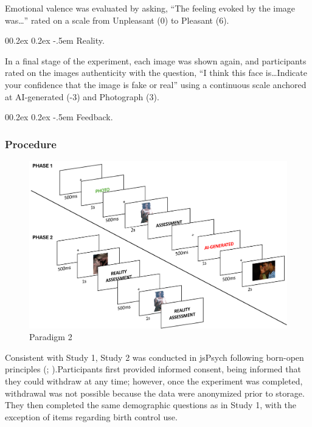 \documentclass[
  jou,
  floatsintext,
  longtable,
  nolmodern,
  notxfonts,
  notimes,
  colorlinks=true,linkcolor=blue,citecolor=blue,urlcolor=blue]{apa7}
\makeatletter
\renewcommand{\paragraph}{\@startsection{paragraph}{4}{\parindent}%
	{0\baselineskip \@plus 0.2ex \@minus 0.2ex}%
	{-.5em}%
	{\normalfont\normalsize\bfseries\typesectitle}}
\makeatother
\begin{document}
Emotional valence was evaluated by asking, ``The feeling evoked by the
image was\ldots{}'' rated on a scale from Unpleasant (0) to Pleasant
(6).

\paragraph{Reality.}\label{reality}

In a final stage of the experiment, each image was shown again, and
participants rated on the images authenticity with the question, ``I
think this face is\ldots Indicate your confidence that the image is fake
or real'' using a continuous scale anchored at AI-generated (-3) and
Photograph (3).

\paragraph{Feedback.}\label{feedback-1}

\subsubsection{Procedure}\label{procedure}

\begin{figure}[!htbp]

{\caption{{Paradigm 2}{\label{fig-paradigm2}}}}

\includegraphics[width=1\linewidth,height=\textheight,keepaspectratio]{images/Paradigm2.png}

\end{figure}

Consistent with Study 1, Study 2 was conducted in jsPsych following
born-open principles (;
).Participants first provided
informed consent, being informed that they could withdraw at any time;
however, once the experiment was completed, withdrawal was not possible
because the data were anonymized prior to storage. They then completed
the same demographic questions as in Study 1, with the exception of
items regarding birth control use.
\end{document}
